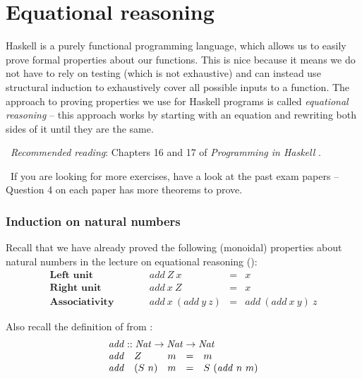 \section{Equational reasoning}

Haskell is a purely functional programming language, which allows us to easily prove formal properties about our functions. This is nice because it means we do not have to rely on testing (which is not exhaustive) and can instead use structural induction to exhaustively cover all possible inputs to a function. The approach to proving properties we use for Haskell programs is called \emph{equational reasoning} -- this approach works by starting with an equation and rewriting both sides of it until they are the same. 

\makebox[0.5cm]{\faBook}~\emph{Recommended reading}: Chapters 16 and 17 of \emph{Programming in Haskell} \citep{hutton2016programming}.

\makebox[0.5cm]{\faLightbulbO}~If you are looking for more exercises, have a look at the past exam papers -- Question 4 on each paper has more theorems to prove.

\subsubsection{Induction on natural numbers}

Recall that we have already proved the following (monoidal) properties about natural numbers in the lecture on equational reasoning ():
\begin{displaymath}
\begin{array}{lcrcl}
\textbf{Left unit} &\qquad & \mathit{add}~Z~x & = & x \\
\textbf{Right unit} &\qquad & \mathit{add}~x~Z & = & x \\
\textbf{Associativity} & \qquad & \mathit{add}~x~(\mathit{add}~y~z) & = & \mathit{add}~(\mathit{add}~x~y)~z 
\end{array}
\end{displaymath}

Also recall the definition of  from :
\begin{displaymath}
\begin{array}{lllcl}
\multicolumn{5}{l}{\mathit{add} :: \mathit{Nat} \to \mathit{Nat} \to \mathit{Nat}} \\
\mathit{add} & Z & m & = & m \\
\mathit{add} & (S~n) & m & = & S~(\mathit{add}~n~m)
\end{array}
\end{displaymath}

